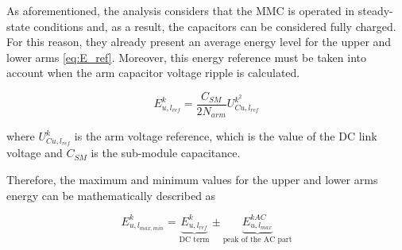 \documentclass[journal]{IEEEtran}
\begin{document}

As aforementioned, the analysis considers that the MMC is operated in steady-state conditions and, as a result, the capacitors can be considered fully charged. For this reason, they already present an average energy level for the upper and lower arms \eqref{eq:E_ref}. Moreover, this energy reference must be taken into account when the arm capacitor voltage ripple is calculated.

\begin{equation}
E_{u,l_{ref}}^k = \dfrac{C_{SM}}{2N_{arm}}U_{Cu,l_{ref}}^{k^2}
\label{eq:E_ref}
\end{equation} 

\noindent where $U_{Cu,l_{ref}}^k$ is the arm voltage reference, which is the value of the DC link voltage and $C_{SM}$ is the sub-module capacitance. 

Therefore, the maximum and minimum values for the upper and lower arms energy can be mathematically described as

\begin{equation}
E_{u,l_{max,min}}^k = \underbrace{E_{u,l_{ref}}^k}_\text{DC term} \pm   \underbrace{E_{u,l_{max}}^{kAC}}_\text{peak of the AC  part}
\label{eq:Eul_max_min}
\end{equation}
%
\end{document}
